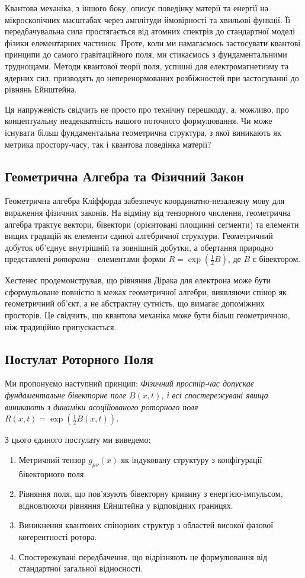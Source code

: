\documentclass[11pt,a4paper]{article}
\numberwithin{equation}{section}
\theoremstyle{plain}
\theoremstyle{definition}
\theoremstyle{remark}
\begin{document}
Квантова механіка, з іншого боку, описує поведінку матерії та енергії на мікроскопічних масштабах через амплітуди ймовірності та хвильові функції. Її передбачувальна сила простягається від атомних спектрів до стандартної моделі фізики елементарних частинок. Проте, коли ми намагаємось застосувати квантові принципи до самого гравітаційного поля, ми стикаємось з фундаментальними труднощами. Методи квантової теорії поля, успішні для електромагнетизму та ядерних сил, призводять до неперенормованих розбіжностей при застосуванні до рівнянь Ейнштейна.

Ця напруженість свідчить не просто про технічну перешкоду, а, можливо, про концептуальну неадекватність нашого поточного формулювання. Чи може існувати більш фундаментальна геометрична структура, з якої виникають як метрика простору-часу, так і квантова поведінка матерії?

\subsection{Геометрична Алгебра та Фізичний Закон}

Геометрична алгебра Кліффорда забезпечує координатно-незалежну мову для вираження фізичних законів. На відміну від тензорного числення, геометрична алгебра трактує вектори, бівектори (орієнтовані площинні сегменти) та елементи вищих градацій як елементи єдиної алгебричної структури. Геометричний добуток об'єднує внутрішній та зовнішній добутки, а обертання природно представлені \emph{роторами}---елементами форми $R=\exp(\frac{1}{2}B)$, де $B$ є бівектором.

Хестенес продемонстрував, що рівняння Дірака для електрона може бути сформульоване повністю в межах геометричної алгебри, виявляючи спінор як геометричний об'єкт, а не абстрактну сутність, що вимагає допоміжних просторів. Це свідчить, що квантова механіка може бути більш геометричною, ніж традиційно припускається.

\subsection{Постулат Роторного Поля}

Ми пропонуємо наступний принцип: \emph{Фізичний простір-час допускає фундаментальне бівекторне поле $B(x,t)$, і всі спостережувані явища виникають з динаміки асоційованого роторного поля $R(x,t)=\exp(\frac{1}{2}B(x,t))$.}

З цього єдиного постулату ми виведемо:

\begin{enumerate}
  \item Метричний тензор $g_{\mu\nu}(x)$ як індуковану структуру з конфігурації бівекторного поля.
  \item Рівняння поля, що пов'язують бівекторну кривину з енергією-імпульсом, відновлюючи рівняння Ейнштейна у відповідних границях.
  \item Виникнення квантових спінорних структур з областей високої фазової когерентності ротора.
  \item Спостережувані передбачення, що відрізняють це формулювання від стандартної загальної відносності.
\end{enumerate}
\end{document}
